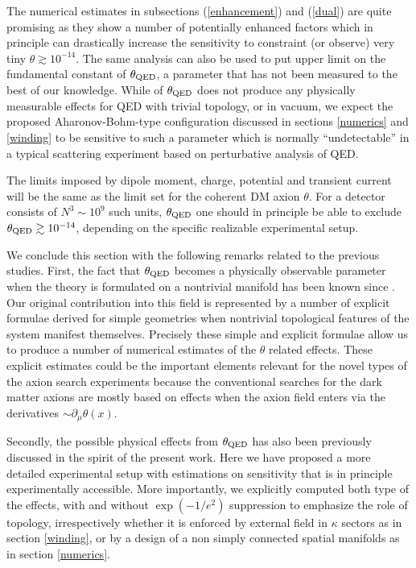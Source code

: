 \documentclass[ twocolumn,aps,prd,   
               preprintnumbers,numbers,sort&compress,nofootinbib,
                            showpacs,superscriptaddress,
               colorlinks,
               linkcolor=blue,   
               citecolor=blue]{revtex4-1}   \newcommand{\exclude}[1]{}
\begin{document}
The numerical estimates in subsections (\ref{enhancement}) and (\ref{dual}) are quite promising as they show   a number of potentially  enhanced  factors which in principle can drastically increase the sensitivity to constraint (or observe) very tiny $\theta \gtrsim  10^{-14}$.
The same analysis    can also be used to   put upper limit on the fundamental constant of $\theta_{\rm QED}$, a parameter that has not been measured to the best of our knowledge. While of $\theta_{\rm QED}$ does not produce any physically measurable effects for QED with trivial topology, or in vacuum,  we expect the proposed Aharonov-Bohm-type configuration discussed in sections \ref{numerics} and \ref{winding} to be sensitive to such a parameter which is normally ``undetectable'' in a typical scattering experiment based on perturbative analysis of QED. 

The limits imposed by dipole moment, charge, potential and transient current will be the same as the limit set for  the coherent DM axion $\theta$. For a detector consists of $N^3\sim 10^9$ such units, $\theta_{\rm QED}$ one should in principle be able to exclude $\theta_{\rm QED}\gtrsim  10^{-14}$, depending on the specific realizable experimental setup.


We conclude this section with the following remarks related to the previous studies.  First, the fact that  $\theta_{\rm QED}$ becomes a physically observable parameter when  the theory is formulated on a nontrivial manifold 
has been known  since  \cite{Witten:1995gf,Verlinde:1995mz,Olive:2000yy}. Our original contribution into this field is  represented by 
a number of  explicit formulae derived for simple geometries when nontrivial    topological features
of the system   manifest themselves. Precisely these simple and explicit formulae  allow us to produce a number of numerical estimates
of the $\theta$ related effects. These explicit estimates could be the important   elements relevant for  the novel types of the axion search experiments 
because the conventional searches for the dark matter axions are mostly based on effects  when the axion field enters via the derivatives $\sim \partial_{\mu}\theta(x)$.
  
 

Secondly, the possible physical effects from $\theta_{\rm QED}$ has also been previously discussed \cite{Hsu:2010jm,Hsu:2011sx} in the   spirit of the present work. Here we have proposed a more detailed experimental setup with estimations on sensitivity that is in principle experimentally accessible. More importantly, we explicitly computed both type of the effects, with and without $\exp(-1/e^2)$ suppression to emphasize the role of topology, irrespectively   whether it is enforced by external field in  $\kappa$ sectors as in section \ref{winding}, or by a  design of a  non simply connected spatial manifolds as in section \ref{numerics}. 
\end{document}
